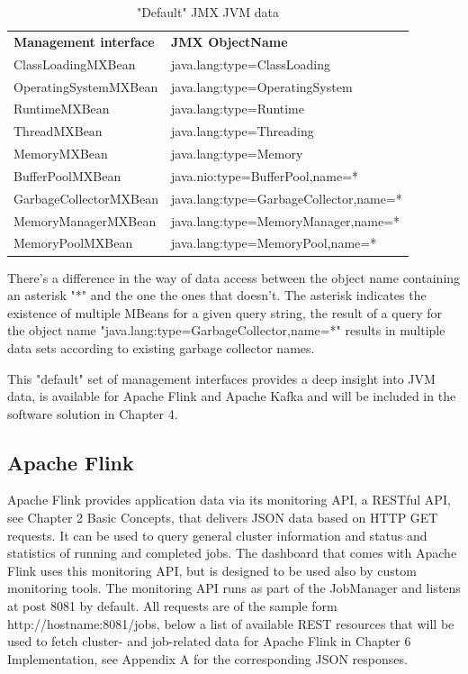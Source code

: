 \begin{table}[H]
    \begin{tabular}{ll}
        \textbf{Management interface} & \textbf{JMX ObjectName} \\
        ClassLoadingMXBean & java.lang:type=ClassLoading \\
        OperatingSystemMXBean & java.lang:type=OperatingSystem \\
        RuntimeMXBean & java.lang:type=Runtime \\
        ThreadMXBean & java.lang:type=Threading \\
        MemoryMXBean & java.lang:type=Memory \\
        BufferPoolMXBean & java.nio:type=BufferPool,name=* \\
        GarbageCollectorMXBean & java.lang:type=GarbageCollector,name=* \\
        MemoryManagerMXBean & java.lang:type=MemoryManager,name=* \\
        MemoryPoolMXBean & java.lang:type=MemoryPool,name=* \\
    \end{tabular}
    \caption{"Default" JMX JVM data}
    \label{tbl:jmxjvmdata}
\end{table}

There's a difference in the way of data access between the object name containing an asterisk "*"
and the one the ones that doesn't. The asterisk indicates the existence of multiple MBeans for a given query string,
the result of a query for the object name "java.lang:type=GarbageCollector,name=*" results in multiple data sets according
to existing garbage collector names.

This "default" set of management interfaces provides a deep insight into JVM data, is
available for Apache Flink and Apache Kafka and will be included in the software solution
in Chapter 4.

\subsection{Apache Flink}

Apache Flink provides application data via its monitoring API, a RESTful API, see
Chapter 2 Basic Concepts, that delivers JSON data based on HTTP
GET requests. It can be used to query general cluster information and status and
statistics of running and completed jobs. The dashboard that comes with Apache Flink
uses this monitoring API, but is designed to be used also by custom monitoring tools. The
monitoring API runs as part of the JobManager and listens at post 8081 by default. All requests
are of the sample form http://hostname:8081/jobs, below a list of available REST resources that
will be used to fetch cluster- and job-related data for Apache Flink in Chapter 6 Implementation,
see Appendix A for the corresponding JSON responses.

